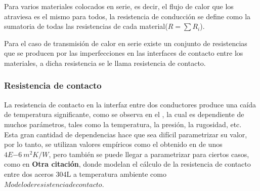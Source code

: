 Para varios materiales colocados en serie, es decir, el flujo de calor que los atraviesa es el mismo para todos, la resistencia de conducción se define como la sumatoria de todas las resistencias de cada material($R=\sum R_i$).

Para el caso de transmisión de calor en serie existe un conjunto de resistencias que se producen por las imperfecciones en las interfaces de contacto entre los materiales, a dicha resistencia se le llama resistencia de contacto.


\subsubsection{Resistencia de contacto}
La resistencia de contacto en la interfaz entre dos conductores produce una caída de temperatura significante, como se observa en el \cite{noauthor_parallel-plate_nodate}, la cual es dependiente de muchos parámetros, tales como la temperatura, la presión, la rugosidad, etc.\\

Esta gran cantidad de dependencias hace que sea difícil parametrizar su valor, por lo tanto, se utilizan valores empíricos como el obtenido en \cite{noauthor_parallel-plate_nodate} de unos $4E{-6} \ m^2K/W$, pero también se puede llegar a parametrizar para ciertos casos, como en \textbf{Otra citación}, donde modelan el cálculo de la resistencia de contacto entre dos aceros 304L a temperatura ambiente como $Modelo de resistencia de contacto$.



